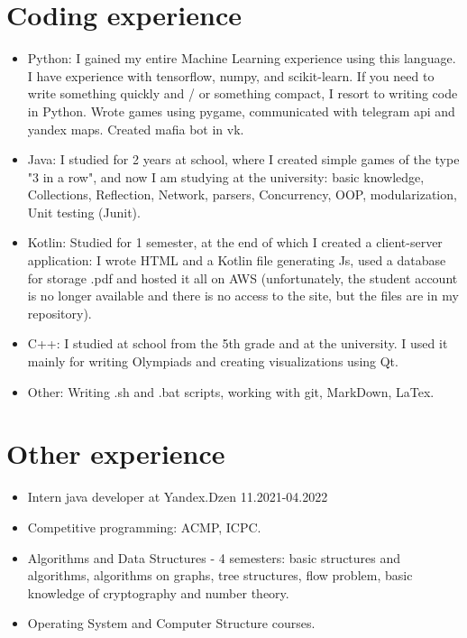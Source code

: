 \documentclass[letter]{deedy-resume}
\begin{document}
    \begin{minipage}[t]{0.6\textwidth}

        \section{Coding experience}

        \begin{itemize}[leftmargin=1em]
            \setlength\itemsep{0em}
            \item Python: I gained my entire Machine Learning experience using this language.
            I have experience with tensorflow, numpy, and scikit-learn.
            If you need to write something quickly and / or something compact, I resort to writing code in Python.
            Wrote games using pygame, communicated with telegram api and yandex maps.
            Created mafia bot in vk.
            \item Java: I studied for 2 years at school, where I created simple games of the type "3 in a row",
            and now I am studying at the university: basic knowledge, Collections, Reflection, Network, parsers,
            Concurrency, OOP, modularization, Unit testing (Junit).
            \item Kotlin: Studied for 1 semester, at the end of which I created a client-server application:
            I wrote HTML and a Kotlin file generating Js, used a database for storage .pdf and hosted it all on AWS
            (unfortunately, the student account is no longer available and there is no access to the site,
            but the files are in my repository).
            \item C++: I studied at school from the 5th grade and at the university.
            I used it mainly for writing Olympiads and creating visualizations using Qt.
            \item Other: Writing .sh and .bat scripts, working with git, MarkDown, LaTex.
        \end{itemize}

        \sectionspace %


        \section{Other experience}

        \begin{itemize}[leftmargin=1em]
            \setlength\itemsep{0em}
	    \item Intern java developer at Yandex.Dzen 11.2021-04.2022
            \item Competitive programming: ACMP,  ICPC.
            \item Algorithms and Data Structures - 4 semesters: basic structures and algorithms,
            algorithms on graphs, tree structures, flow problem, basic knowledge of cryptography and number theory.
            \item Operating System and Computer Structure courses.
        \end{itemize}


\end{minipage}
\end{document}
